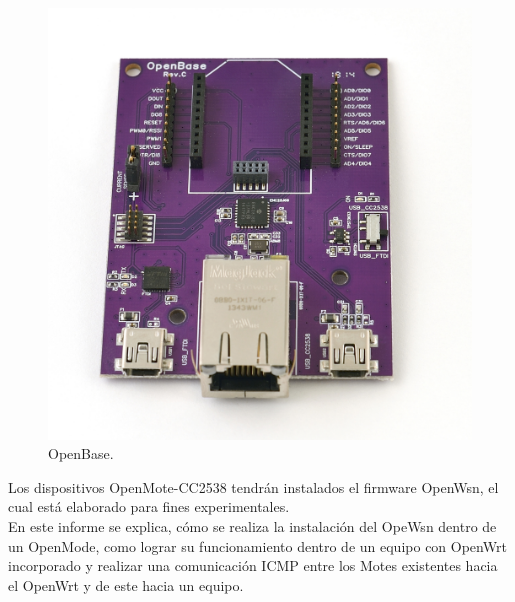 \documentclass[journal]{IEEEtran}
\begin{document}
\begin{itemize}
\begin{figure}[!ht]
\begin{center}
			\includegraphics[scale=0.23]{openbase.jpg}
			\end{center}			            
			\caption{OpenBase.}        
        \end{figure}   
\end{itemize}
Los dispositivos OpenMote-CC2538 tendrán instalados el firmware OpenWsn, el cual está elaborado para fines experimentales.
\\
En este informe se explica, cómo se realiza la instalación del OpeWsn dentro de un OpenMode, como lograr su funcionamiento dentro de un equipo con OpenWrt incorporado y realizar una comunicación ICMP entre los Motes existentes hacia el OpenWrt y de este hacia un equipo.
\end{document}
